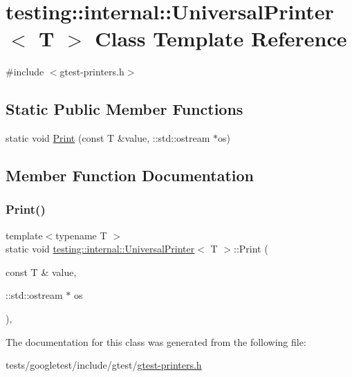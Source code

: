 \hypertarget{classtesting_1_1internal_1_1UniversalPrinter}{}\section{testing\+:\+:internal\+:\+:Universal\+Printer$<$ T $>$ Class Template Reference}
\label{classtesting_1_1internal_1_1UniversalPrinter}


{\ttfamily \#include $<$gtest-\/printers.\+h$>$}

\subsection*{Static Public Member Functions}
\begin{DoxyCompactItemize}
\item 
static void \hyperlink{classtesting_1_1internal_1_1UniversalPrinter_aecec021e1abbaa260b701e24e3fe33eb}{Print} (const T \&value, \+::std\+::ostream $\ast$os)
\end{DoxyCompactItemize}


\subsection{Member Function Documentation}
\mbox{\label{classtesting_1_1internal_1_1UniversalPrinter_aecec021e1abbaa260b701e24e3fe33eb}} 
\subsubsection{\texorpdfstring{Print()}{Print()}}
{\footnotesize\ttfamily template$<$typename T $>$ \\
static void \hyperlink{classtesting_1_1internal_1_1UniversalPrinter}{testing\+::internal\+::\+Universal\+Printer}$<$ T $>$\+::Print (\begin{DoxyParamCaption}\item[{const T \&}]{value,  }\item[{\+::std\+::ostream $\ast$}]{os }\end{DoxyParamCaption})\hspace{0.3cm}{\ttfamily [inline]}, {\ttfamily [static]}}



The documentation for this class was generated from the following file\+:\begin{DoxyCompactItemize}
\item 
tests/googletest/include/gtest/\hyperlink{gtest-printers_8h}{gtest-\/printers.\+h}\end{DoxyCompactItemize}
